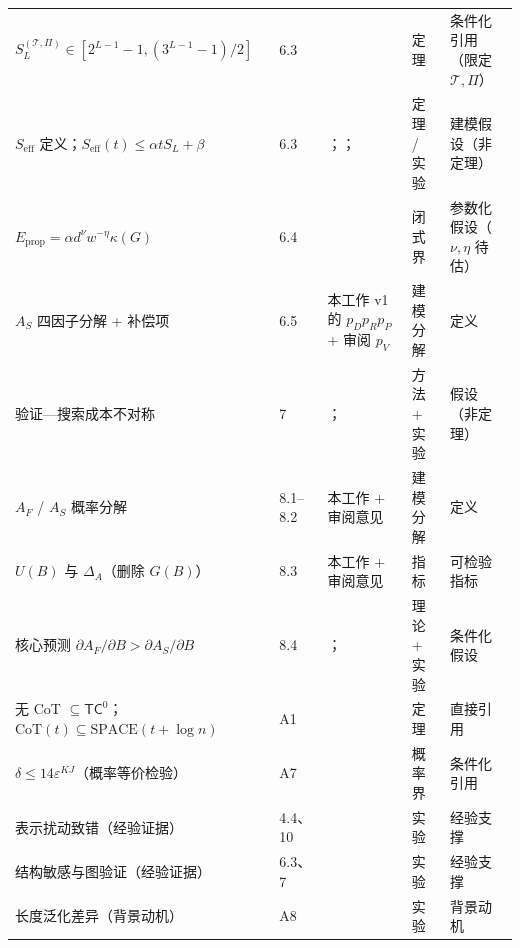 \documentclass[11pt]{ctexart}
\begin{document}
\begin{small}
\begin{longtable}{p{4.1cm}p{0.9cm}p{4.7cm}p{1.9cm}p{2.9cm}}
$S_L^{(\mathcal{T},\Pi)}\in[2^{L-1}-1,(3^{L-1}-1)/2]$ & 6.3 & \cite{tian} & 定理 & 条件化引用（限定 $\mathcal{T},\Pi$） \\
$S_{\mathrm{eff}}$ 定义；$S_{\mathrm{eff}}(t)\le\alpha tS_L+\beta$ & 6.3 & \cite{cotexpressive}；\cite{cotserial}；\cite{loopthink} & 定理 / 实验 & 建模假设（非定理） \\
$E_{\mathrm{prop}}=\alpha d^{\nu}w^{-\eta}\kappa(G)$ & 6.4 & \cite{predictivemaps} & 闭式界 & 参数化假设（$\nu,\eta$ 待估） \\
$A_S$ 四因子分解 + 补偿项 & 6.5 & 本工作 v1 的 $p_Dp_Rp_P$ + 审阅 $p_V$ & 建模分解 & 定义 \\
验证—搜索成本不对称 & 7 & \cite{graphverif}；\cite{mathrobust} & 方法 + 实验 & 假设（非定理） \\
$A_F$ / $A_S$ 概率分解 & 8.1–8.2 & 本工作 + 审阅意见 & 建模分解 & 定义 \\
$U(B)$ 与 $\Delta_A$（删除 $G(B)$） & 8.3 & 本工作 + 审阅意见 & 指标 & 可检验指标 \\
核心预测 $\partial A_F/\partial B>\partial A_S/\partial B$ & 8.4 & \cite{stmlayer}；\cite{mathrobust} & 理论 + 实验 & 条件化假设 \\
无 CoT $\subseteq\mathsf{TC}^0$；$\mathrm{CoT}(t)\subseteq\mathrm{SPACE}(t+\log n)$ & A1 & \cite{cotexpressive} & 定理 & 直接引用 \\
$\delta\le14\varepsilon^{KJ}$（概率等价检验） & A7 & \cite{mathrobust} & 概率界 & 条件化引用 \\
表示扰动致错（经验证据） & 4.4、10 & \cite{symmetries,geometry,fragile,mathrobust,reorder,semantic} & 实验 & 经验支撑 \\
结构敏感与图验证（经验证据） & 6.3、7 & \cite{tian,predictivemaps,quiver,graphverif,gnn} & 实验 & 经验支撑 \\
长度泛化差异（背景动机） & A8 & \cite{lenzhang} & 实验 & 背景动机 \\
\bottomrule
\end{longtable}
\end{small}
\end{document}
